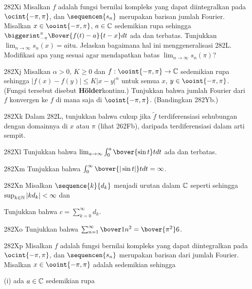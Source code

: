 {\spheader 282Xi Misalkan $f$ adalah fungsi bernilai kompleks yang dapat diintegralkan
pada $\ocint{-\pi,\pi}$, dan $\sequencen{s_n}$ merupakan barisan jumlah Fourier.   Misalkan $x\in\ooint{-\pi,\pi}$, $a\in\Bbb C$ sedemikian rupa sehingga
$\biggerint_{-\pi}^{\pi}\Bover{f(t)-a}{t-x}dt$ ada dan terbatas.
Tunjukkan $\lim_{n\to\infty}s_n(x)=a$itu.
Jelaskan bagaimana hal ini menggeneralisasi 282L.   Modifikasi apa yang sesuai agar
mendapatkan batas $\lim_{n\to\infty}s_n(\pi)$?

\spheader 282Xj Misalkan $\alpha>0$, $K\ge 0$ dan
$f:\ooint{-\pi,\pi}\to\Bbb C$ sedemikian rupa sehingga
$|f(x)-f(y)|\le K|x-y|^{\alpha}$ untuk semua $x$, $y\in\ooint{-\pi,\pi}$.
(Fungsi tersebut disebut {\bf H\"older}kontinu.)
Tunjukkan bahwa jumlah Fourier dari $f$ konvergen ke $f$ di mana saja di
$\ooint{-\pi,\pi}$.     (Bandingkan 282Yb.)

\spheader 282Xk Dalam 282L, tunjukkan bahwa cukup jika $\tilde f$
terdiferensiasi sehubungan dengan domainnya di $x$ atau $\pi$ (lihat 262Fb),
daripada terdiferensiasi dalam arti sempit.

\spheader 282Xl Tunjukkan bahwa $\lim_{a\to\infty}\int_0^a\bover{\sin t}tdt$
ada dan terbatas.   
%

\spheader 282Xm Tunjukkan bahwa
$\int_0^{\infty}\bover{|\sin t|}tdt=\infty$.   

\sqheader 282Xn Misalkan $\sequence{k}{d_k}$ menjadi urutan dalam $\Bbb C$ seperti
sehingga $\sup_{k\in\Bbb N}|kd_k|<\infty$ dan


\noindent Tunjukkan bahwa $c=\sum_{k=0}^{\infty}d_k$.   

\sqheader 282Xo Tunjukkan bahwa
$\sum_{n=1}^{\infty}\bover1{n^2}=\bover{\pi^2}6$.   

\spheader 282Xp Misalkan $f$ adalah fungsi bernilai kompleks
yang dapat diintegralkan pada $\ocint{-\pi,\pi}$, dan $\sequencen{s_n}$ merupakan barisan
dari jumlah Fourier.    Misalkan $x\in\ooint{-\pi,\pi}$ adalah
sedemikian sehingga

(i) ada $a\in\Bbb C$ sedemikian rupa

}
